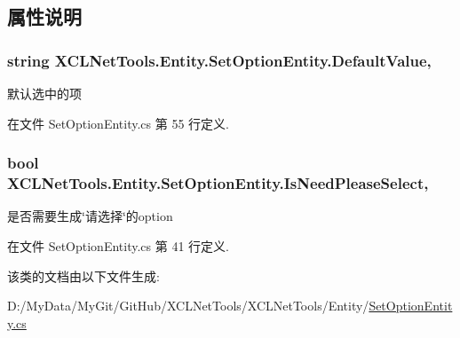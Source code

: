 \subsection{属性说明}
\hypertarget{class_x_c_l_net_tools_1_1_entity_1_1_set_option_entity_a504fe6ad96f52cb7eb9f8a4e64e07723}{
\subsubsection[{Default\-Value}]{\setlength{\rightskip}{0pt plus 5cm}string X\-C\-L\-Net\-Tools.\-Entity.\-Set\-Option\-Entity.\-Default\-Value\hspace{0.3cm}{\ttfamily [get]}, {\ttfamily [set]}}}\label{class_x_c_l_net_tools_1_1_entity_1_1_set_option_entity_a504fe6ad96f52cb7eb9f8a4e64e07723}


默认选中的项 



在文件 Set\-Option\-Entity.\-cs 第 55 行定义.

\hypertarget{class_x_c_l_net_tools_1_1_entity_1_1_set_option_entity_a22c7d14f09183bb9124fa9219663be6c}{
\subsubsection[{Is\-Need\-Please\-Select}]{\setlength{\rightskip}{0pt plus 5cm}bool X\-C\-L\-Net\-Tools.\-Entity.\-Set\-Option\-Entity.\-Is\-Need\-Please\-Select\hspace{0.3cm}{\ttfamily [get]}, {\ttfamily [set]}}}\label{class_x_c_l_net_tools_1_1_entity_1_1_set_option_entity_a22c7d14f09183bb9124fa9219663be6c}


是否需要生成\char`\"{}请选择\char`\"{}的option 



在文件 Set\-Option\-Entity.\-cs 第 41 行定义.



该类的文档由以下文件生成\-:\begin{DoxyCompactItemize}
\item 
D\-:/\-My\-Data/\-My\-Git/\-Git\-Hub/\-X\-C\-L\-Net\-Tools/\-X\-C\-L\-Net\-Tools/\-Entity/\hyperlink{_set_option_entity_8cs}{Set\-Option\-Entity.\-cs}\end{DoxyCompactItemize}
